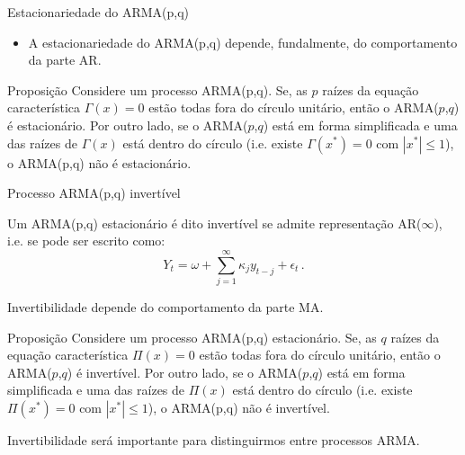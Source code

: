 \documentclass[11pt]{beamer}
\newenvironment{halfwideitemize}{\itemize\addtolength{\itemsep}{0.5em}}{\enditemize}
\begin{document}
\begin{frame}{Estacionariedade do ARMA(p,q)}
	\begin{itemize}
		\item A estacionariedade do ARMA(p,q) depende, fundalmente, do comportamento da parte AR.
	\end{itemize}
					\begin{block}{Proposição}
		Considere um processo ARMA(p,q). Se, as $p$ raízes da equação característica $\Gamma(x) = 0$ estão todas fora do círculo unitário, então o ARMA($p$,$q$) é estacionário. Por outro lado, se o ARMA($p$,$q$) está em forma simplificada e uma das raízes de $\Gamma(x)$ está dentro do círculo (i.e. existe $\Gamma(x^*)=0$ com $|x^*| \leq 1$), o ARMA(p,q) não é estacionário.
	\end{block}
\end{frame}
\begin{frame}{Processo ARMA(p,q) invertível}
	\begin{halfwideitemize}
		\item 	Um ARMA(p,q) estacionário é dito {\color{blue}invertível} se admite representação AR($\infty$), i.e. se pode ser escrito como:
		$$Y_t = \omega +\sum_{j=1}^\infty \kappa_j y_{t-j} + \epsilon_t\, .$$
		
		\item Invertibilidade depende do comportamento da parte MA.
		
				\begin{block}{Proposição}
			Considere um processo ARMA(p,q) estacionário. Se, as $q$ raízes da equação característica $\Pi(x) = 0$ estão todas fora do círculo unitário, então o ARMA($p$,$q$) é invertível. Por outro lado, se o ARMA($p$,$q$) está em forma simplificada e uma das raízes de $\Pi(x)$ está dentro do círculo  (i.e. existe $\Pi(x^*)=0$ com $|x^*| \leq 1$), o ARMA(p,q) não é invertível.
		\end{block}
		\item Invertibilidade será importante para distinguirmos entre processos ARMA.
	\end{halfwideitemize}

\end{frame}
\end{document}
